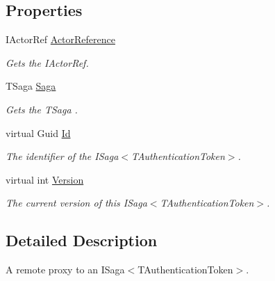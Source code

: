 \subsection*{Properties}
\begin{DoxyCompactItemize}
\item 
I\+Actor\+Ref \hyperlink{classCqrs_1_1Akka_1_1Domain_1_1AkkaSagaProxy_a5f1a7eae545d74336856ca7ec7625334_a5f1a7eae545d74336856ca7ec7625334}{Actor\+Reference}
\begin{DoxyCompactList}\small\item\em Gets the I\+Actor\+Ref. \end{DoxyCompactList}\item 
T\+Saga \hyperlink{classCqrs_1_1Akka_1_1Domain_1_1AkkaSagaProxy_ac63a109e223eb4f046ebe9ad22b9a850_ac63a109e223eb4f046ebe9ad22b9a850}{Saga}
\begin{DoxyCompactList}\small\item\em Gets the {\itshape T\+Saga} . \end{DoxyCompactList}\item 
virtual Guid \hyperlink{classCqrs_1_1Akka_1_1Domain_1_1AkkaSagaProxy_acb65bb91f7dfacc6eca8e12b6a772b20_acb65bb91f7dfacc6eca8e12b6a772b20}{Id}
\begin{DoxyCompactList}\small\item\em The identifier of the I\+Saga$<$\+T\+Authentication\+Token$>$. \end{DoxyCompactList}\item 
virtual int \hyperlink{classCqrs_1_1Akka_1_1Domain_1_1AkkaSagaProxy_ab6272400fe5c6227a11cf5c93f752d4d_ab6272400fe5c6227a11cf5c93f752d4d}{Version}
\begin{DoxyCompactList}\small\item\em The current version of this I\+Saga$<$\+T\+Authentication\+Token$>$. \end{DoxyCompactList}\end{DoxyCompactItemize}


\subsection{Detailed Description}
A remote proxy to an I\+Saga$<$\+T\+Authentication\+Token$>$. 


